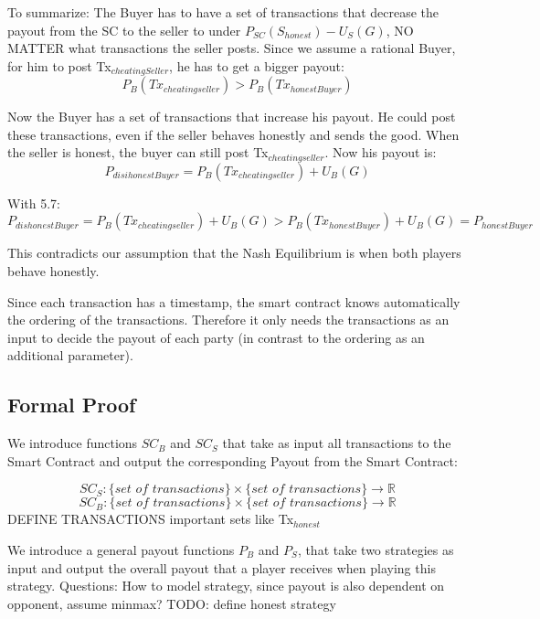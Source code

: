 \documentclass{cacthesis}
\begin{document}
To summarize: The Buyer has to have a set of transactions that decrease the payout from the SC to the seller to under $P_{SC}(S_{honest})- U_S(G)$, NO MATTER what transactions the seller posts.\newline
Since we assume a rational Buyer, for him to post Tx$_{cheatingSeller}$, he has to get a bigger payout:
\begin{equation}
    P_{B}(Tx_{cheatingseller}) > P_{B}(Tx_{honestBuyer})
\end{equation}

Now the Buyer has a set of transactions that increase his payout.  He could post these transactions, even if the seller behaves honestly and sends the good.\newline
{}
When the seller is honest, the buyer can still post Tx$_{cheatingseller}$. Now his payout is:
\[P_{disihonestBuyer} = P_{B}(Tx_{cheatingseller}) + U_B(G)\]

With 5.7:
\begin{equation}
    P_{dishonestBuyer} = P_{B}(Tx_{cheatingseller}) + U_B(G) > P_{B}(Tx_{honestBuyer}) + U_B(G) = P_{honestBuyer}
\end{equation}

This contradicts our assumption that the Nash Equilibrium is when both players behave honestly.

Since each transaction has a timestamp, the smart contract knows automatically the ordering of the transactions. Therefore it only needs the transactions as an input to decide the payout of each party (in contrast to the ordering as an additional parameter).

\subsection{Formal Proof}
We introduce functions $SC_B$ and $SC_S$ that take as input all transactions to the Smart Contract and output the corresponding Payout from the Smart Contract:

\[ SC_S : \{ \textit{set of transactions}\} \times \{ \textit{set of transactions}\} \to \mathbb{R} \]
\[ SC_B : \{ \textit{set of transactions}\} \times \{ \textit{set of transactions}\} \to \mathbb{R} \]
DEFINE TRANSACTIONS\newline
important sets like Tx$_{honest}$  


We introduce a general payout functions $P_B$ and $P_S$, that take two strategies as input and output the overall payout that a player receives when playing this strategy.\newline
Questions: How to model strategy, since payout is also dependent on opponent, assume minmax?\newline
TODO: define honest strategy
\end{document}
